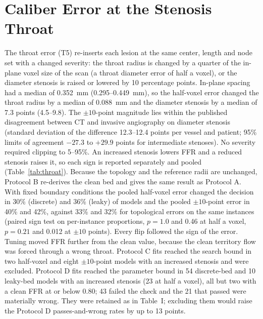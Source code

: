 \documentclass[journal,twoside,web,onecolumn]{ieeecolor}
\begin{document}
\section{Caliber Error at the Stenosis Throat}\label{sec:throat}
The throat error (T5) re-inserts each lesion at the same center, length and node set with a changed severity: the
throat radius is changed by a quarter of the in-plane voxel size of the scan (a throat diameter error of half a voxel),
or the diameter stenosis is raised or lowered by 10 percentage points. In-plane spacing had a median of 0.352~mm
(0.295--0.449~mm), so the half-voxel error changed the throat radius by a median of 0.088~mm and the diameter stenosis
by a median of 7.3 points (4.5--9.8). The $\pm 10$-point magnitude lies within the published disagreement between CT
and invasive angiography on diameter stenosis (standard deviation of the difference 12.3--12.4 points per vessel and
patient; 95\% limits of agreement $-27.3$ to $+29.9$ points for intermediate stenoses). No severity required clipping
to 5--95\%. An increased stenosis lowers FFR and a reduced stenosis raises it, so each sign is reported separately and
pooled (Table~\ref{tab:throat}). Because the topology and the reference radii are unchanged, Protocol B re-derives
the clean bed and gives the same result as Protocol A. With fixed boundary conditions the pooled half-voxel error
changed the decision in 30\% (discrete) and 36\% (leaky) of models and the pooled $\pm 10$-point error in 40\% and
42\%, against 33\% and 32\% for topological errors on the same instances (paired sign test on per-instance
proportions, $p = 1.0$ and 0.46 at half a voxel, $p = 0.21$ and 0.012 at $\pm 10$ points). Every flip followed the
sign of the error. Tuning moved FFR further from the clean value, because the clean territory flow was forced through
a wrong throat. Protocol C fits reached the search bound in two half-voxel and eight $\pm 10$-point models with an
increased stenosis and were excluded. Protocol D fits reached the parameter bound in 54 discrete-bed and 10
leaky-bed models with an increased stenosis (23 at half a voxel), all but two with a clean FFR at or below 0.80;
43 failed the check and the 21 that passed were materially wrong. They were retained as in Table~I; excluding them
would raise the Protocol D passes-and-wrong rates by up to 13 points.
\end{document}
